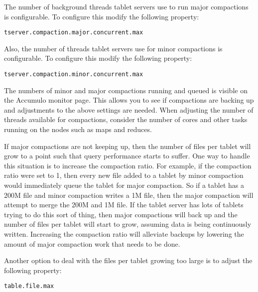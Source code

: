 The number of background threads tablet servers use to run major compactions is
configurable.  To configure this modify the following property:

\begin{verbatim}
tserver.compaction.major.concurrent.max
\end{verbatim}

Also, the number of threads tablet servers use for minor compactions is
configurable.  To configure this modify the following property:

\begin{verbatim}
tserver.compaction.minor.concurrent.max
\end{verbatim}

The numbers of minor and major compactions running and queued is visible on the
Accumulo monitor page.  This allows you to see if compactions are backing up
and adjustments to the above settings are needed.  When adjusting the number of
threads available for compactions, consider the number of cores and other tasks
running on the nodes such as maps and reduces.

If major compactions are not keeping up, then the number of files per tablet
will grow to a point such that query performance starts to suffer. One way to
handle this situation is to increase the compaction ratio.  For example, if the
compaction ratio were set to 1, then every new file added to a tablet by minor
compaction would immediately queue the tablet for major compaction. So if a
tablet has a 200M file and minor compaction writes a 1M file, then the major
compaction will attempt to merge the 200M and 1M file.  If the tablet server
has lots of tablets trying to do this sort of thing, then major compactions
will back up and the number of files per tablet will start to grow, assuming
data is being continuously written.  Increasing the compaction ratio will
alleviate backups by lowering the amount of major compaction work that needs to
be done.

Another option to deal with the files per tablet growing too large is to adjust
the following property:

\begin{verbatim}
table.file.max  
\end{verbatim}

